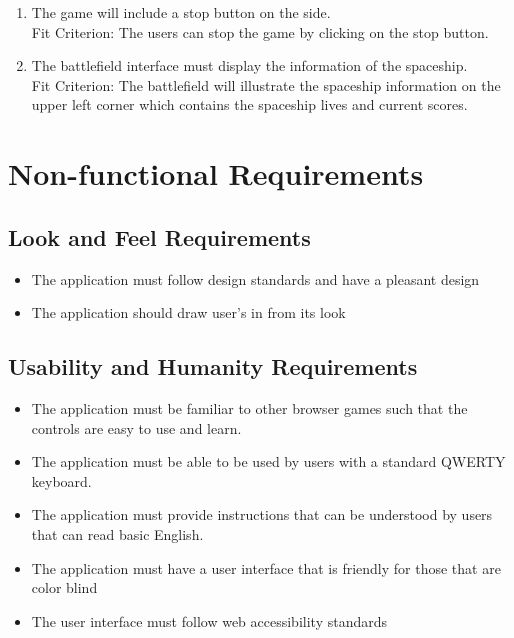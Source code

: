 \documentclass[12pt, titlepage]{article}
\begin{document}
\begin{enumerate}[{FR}1.]
        \item The game will include a stop button on the side. \\
	Fit Criterion: The users can stop the game by clicking on the stop button. 
	\item The battlefield interface must display the information of the spaceship.\\
         Fit Criterion: The battlefield will illustrate the spaceship information on the upper left corner which contains the spaceship lives and current scores.


        




\end{enumerate}

\section{Non-functional Requirements}

\subsection{Look and Feel Requirements}
\begin{itemize}
    \item The application must follow design standards and have a pleasant design
    \item The application should draw user's in from its look
\end{itemize}

\subsection{Usability and Humanity Requirements}
\begin{itemize}
    \item The application must be familiar to other browser games such that the controls are easy to use and learn.
    \item The application must be able to be used by users with a standard QWERTY keyboard.
    \item The application must provide instructions that can be understood by users that can read basic English.
    \item The application must have a user interface that is friendly for those that are color blind
    \item The user interface must follow web accessibility standards
\end{itemize}
\end{document}
